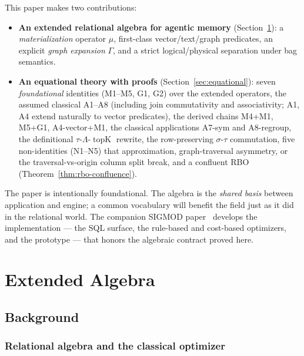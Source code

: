 \documentclass[acmsmall,review,anonymous]{acmart}
\theoremstyle{plain}
\theoremstyle{definition}
\newcommand{\topK}{\operatorname{topK}}
\theoremstyle{remark}
\begin{document}
This paper makes two contributions:

\begin{itemize}[leftmargin=*]
  \item \textbf{An extended relational algebra for agentic memory}
    (Section~\ref{sec:algebra}): a \emph{materialization} operator
    $\mu$, first-class vector/text/graph predicates, an explicit
    \emph{graph expansion} $\Gamma$, and a strict logical/physical
    separation under bag semantics.
  \item \textbf{An equational theory with proofs}
    (Section~\ref{sec:equational}): seven \emph{foundational}
    identities (M1--M5, G1, G2) over the extended operators, the
    assumed classical A1--A8 (including join commutativity and
    associativity; A1, A4 extend naturally to vector predicates),
    the derived chains M4+M1, M5+G1, A4-vector+M1, the classical
    applications A7-sym and A8-regroup, the definitional
    $\tau$-$\Lambda$-$\topK$ rewrite, the row-preserving
    $\sigma$-$\tau$ commutation, five non-identities (N1--N5) that
    approximation, graph-traversal asymmetry, or the
    traversal-vs-origin column split break, and a confluent RBO
    (Theorem~\ref{thm:rbo-confluence}).
\end{itemize}

The paper is intentionally foundational. The algebra is the
\emph{shared basis} between application and engine; a common
vocabulary will benefit the field just as it did in the relational
world. The companion SIGMOD paper~\cite{companion2026sigmod}
develops the implementation --- the SQL surface, the
rule-based and cost-based optimizers, and the prototype --- that
honors the algebraic contract proved here.

\section{Extended Algebra}\label{sec:algebra}

\subsection{Background}\label{sec:background}

\subsubsection*{Relational algebra and the classical optimizer}
\end{document}
